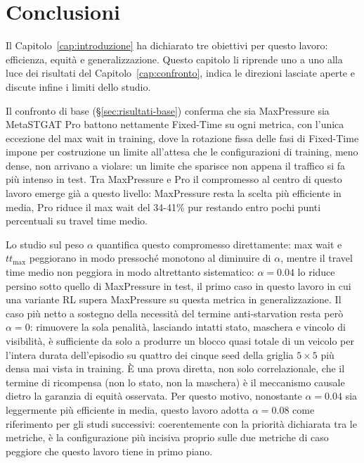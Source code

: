 \chapter{Conclusioni}
\label{cap:conclusioni}

Il Capitolo~\ref{cap:introduzione} ha dichiarato tre obiettivi per questo
lavoro: efficienza, equità e generalizzazione. Questo capitolo li riprende
uno a uno alla luce dei risultati del Capitolo~\ref{cap:confronto}, indica
le direzioni lasciate aperte e discute infine i limiti dello studio.

Il confronto di base (§\ref{sec:risultati-base}) conferma che sia
MaxPressure sia MetaSTGAT Pro battono nettamente Fixed-Time su ogni
metrica, con l'unica eccezione del max wait in training, dove la
rotazione fissa delle fasi di Fixed-Time impone per costruzione un
limite all'attesa che le configurazioni di training, meno dense, non
arrivano a violare: un limite che sparisce non appena il traffico si
fa più intenso in test. Tra MaxPressure e Pro il compromesso al centro di
questo lavoro emerge già a questo livello: MaxPressure resta la scelta più
efficiente in media, Pro riduce il max wait del 34-41\% pur restando entro
pochi punti percentuali su travel time medio.

Lo studio sul peso $\alpha$ quantifica questo compromesso direttamente:
max wait e $tt_{\max}$ peggiorano in modo pressoché monotono al diminuire
di $\alpha$, mentre il travel time medio non peggiora in modo altrettanto
sistematico: $\alpha=0.04$ lo riduce persino sotto quello di MaxPressure
in test, il primo caso in questo lavoro in cui una variante RL supera
MaxPressure su questa metrica in generalizzazione. Il caso più netto a
sostegno della necessità del termine anti-starvation resta però
$\alpha=0$: rimuovere la sola penalità, lasciando intatti stato, maschera
e vincolo di visibilità, è sufficiente da solo a produrre un blocco quasi
totale di un veicolo per l'intera durata dell'episodio su quattro dei
cinque seed della griglia $5\times5$ più densa mai vista in training. È una
prova diretta, non solo correlazionale, che il termine di ricompensa (non
lo stato, non la maschera) è il meccanismo causale dietro la garanzia di
equità osservata. Per questo motivo, nonostante $\alpha=0.04$ sia
leggermente più efficiente in media, questo lavoro adotta $\alpha=0.08$
come riferimento per gli studi successivi: coerentemente con la priorità
dichiarata tra le metriche, è la configurazione più incisiva proprio sulle
due metriche di caso peggiore che questo lavoro tiene in primo piano.

